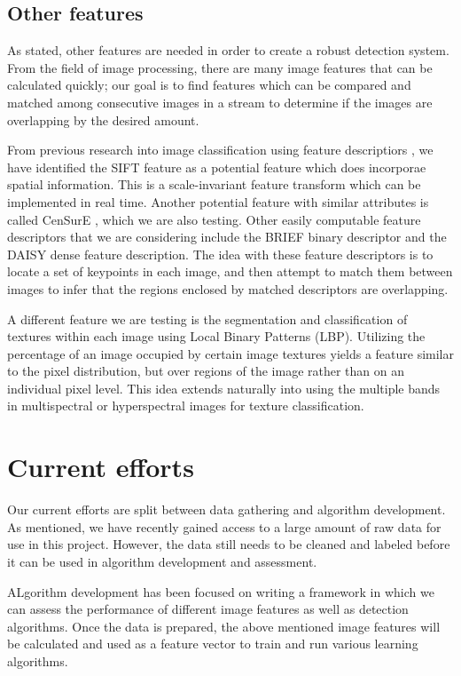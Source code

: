 \subsection{Other features}

As stated, other features are needed in order to create a robust detection system.
From the field of image processing, there are many image features that can be calculated quickly; our goal is to find features which can be compared and matched among consecutive images in a stream to determine if the images are overlapping by the desired amount.

From previous research into image classification using feature descriptiors \cite{anomalyhyper}, we have identified the SIFT feature as a potential feature which does incorporae spatial information.
This is a scale-invariant feature transform which can be implemented in real time.
Another potential feature with similar attributes is called CenSurE \cite{censure} , which we are also testing.
Other easily computable feature descriptors that we are considering include the BRIEF binary descriptor and the DAISY dense feature description.
The idea with these feature descriptors is to locate a set of keypoints in each image, and then attempt to match them between images to infer that the regions enclosed by matched descriptors are overlapping.

A different feature we are testing is the segmentation and classification of textures within each image using Local Binary Patterns (LBP).
Utilizing the percentage of an image occupied by certain image textures yields a feature similar to the pixel distribution, but over regions of the image rather than on an individual pixel level.
This idea extends naturally into using the multiple bands in multispectral or hyperspectral images for texture classification.


\section {Current efforts}
Our current efforts are split between data gathering and algorithm development.
As mentioned, we have recently gained access to a large amount of raw data for use in this project.
However, the data still needs to be cleaned and labeled before it can be used in algorithm development and assessment.

ALgorithm development has been focused on writing a framework in which we can assess the performance of different image features as well as detection algorithms.
Once the data is prepared, the above mentioned image features will be calculated and used as a feature vector to train and run various learning algorithms.


